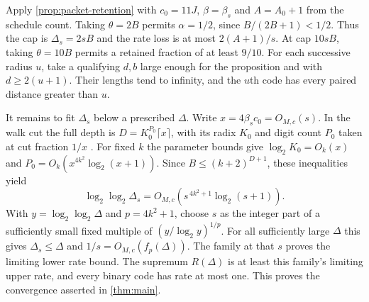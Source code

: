\begin{outline}
Apply \cref{prop:packet-retention} with $c_0=11J$, $\beta=\beta_s$ and
$A=A_0+1$ from the schedule count. Taking $\theta=2B$ permits
$\alpha=1/2$, since $B/(2B+1)<1/2$. Thus the cap is $\Delta_s=2sB$
and the rate loss is at most $2(A+1)/s$. At cap $10sB$, taking $\theta=10B$ permits
a retained fraction of at least $9/10$.
For each successive radius $u$, take a qualifying $d,b$ large enough
for the proposition and with $d\ge2(u+1)$. Their lengths tend to infinity, and
the $u$th code has every paired distance greater than $u$.

It remains to fit $\Delta_s$ below a prescribed $\Delta$.
Write $x=4\beta_s c_0=O_{M,c}(s)$. In the walk cut the full depth is
$D=K_0^{P_0}\lceil x\rceil$, with its radix $K_0$ and digit count $P_0$
taken at cut fraction $1/x$ \cite[Definition~7.1]{PaperFourteen}.
For fixed $k$ the parameter bounds give
$\log_2 K_0=O_k(x)$ and
$P_0=O_k(x^{4k^2}\log_2(x+1))$.
Since $B\le(k+2)^{D+1}$, these inequalities yield
\[
   \log_2\log_2\Delta_s
      =O_{M,c}\!\left(s^{\,4k^2+1}\log_2(s+1)\right).
\]
With $y=\log_2\log_2\Delta$ and $p=4k^2+1$, choose $s$ as the
integer part of a sufficiently small fixed multiple of
$(y/\log_2 y)^{1/p}$. For all sufficiently large $\Delta$ this gives
$\Delta_s\le\Delta$ and $1/s=O_{M,c}(f_p(\Delta))$.
The family at that $s$ proves the limiting lower rate bound.
The supremum $R(\Delta)$ is at least this family's limiting upper rate,
and every binary code has rate at most one. This proves the convergence
asserted in \cref{thm:main}.
\end{outline}
